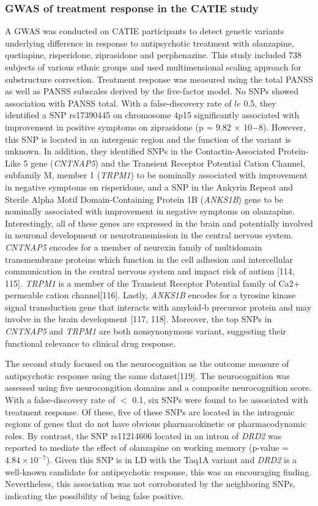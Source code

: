 \documentclass[12pt]{report}
\newcommand{\gene}[1]{\textit{#1}}
\begin{document}
			\subsubsection{GWAS of treatment response in the CATIE study}
				A GWAS was conducted on CATIE participants to detect genetic variants underlying difference in response to antipsychotic treatment with olanzapine, quetiapine, risperidone, ziprasidone and perphenazine. 
				This study included 738 subjects of various ethnic groups and used multimensional scaling approach for substructure correction. 
				Treatment response was measured using the total PANSS as well as PANSS subscales derived by the five-factor model. 
				No SNPs showed association with PANSS total. 
				With a false-discovery rate of $le$ 0.5, they identified a SNP rs17390445 on chromosome 4p15 significantly associated with improvement in positive symptoms on ziprasidone (p = 9.82 × 10−8).
				However, this SNP is located in an intergenic region and the function of the variant is unknown. 
				In addition, they identified SNPs in the Contactin-Associated Protein-Like 5 gene (\gene{CNTNAP5}) and the Transient Receptor Potential Cation Channel, subfamily M, member 1 (\gene{TRPM1}) to be nominally associated with improvement in negative symptoms on risperidone, and a SNP in the Ankyrin Repeat and Sterile Alpha Motif Domain-Containing Protein 1B (\gene{ANKS1B}) gene to be nominally associated with improvement in negative symptoms on olanzapine. 
				Interestingly, all of these genes are expressed in the brain and potentially involved in neuronal development or neurotransmission in the central nervous system. 
				\gene{CNTNAP5} encodes for a member of neurexin family of multidomain transmembrane proteins which function in the cell adhesion and intercellular communication in the central nervous system and impact risk of autism [114, 115]. 
				\gene{TRPM1} is a member of the Transient Receptor Potential family of Ca2+ permeable cation channel[116].
				Lastly, \gene{ANKS1B} encodes for a tyrosine kinase signal transduction gene that interacts with amyloid-b precursor protein and may involve in the brain development [117, 118].
				Moreover, the top SNPs in \gene{CNTNAP5} and \gene{TRPM1} are both nonsynonymous variant, suggesting their functional relevance to clinical drug response.
				 
				The second study focused on the neurocognition as the outcome measure of antipsychotic response using the same dataset[119]. 
				The neurocognition was assessed using five neurocongition domains and a composite neurocognition score. 
				With a false-discovery rate of $<$ 0.1, six SNPs were found to be associated with treatment response.
				Of these, five of these SNPs are located in the intragenic regions of genes that do not have obvious pharmacokinetic or pharmacodynamic roles. 
				By contrast, the SNP rs11214606 located in an intron of \gene{DRD2} was reported to mediate the effect of olanzapine on working memory (p-value = $4.84 \times 10^{-7}$). 
				Given this SNP is in LD with the Taq1A variant and \gene{DRD2} is a well-known candidate for antipsychotic response, this was an encouraging finding. 
				Nevertheless, this association was not corroborated by the neighboring SNPs, indicating the possibility of being false positive. 
				
\end{document}
